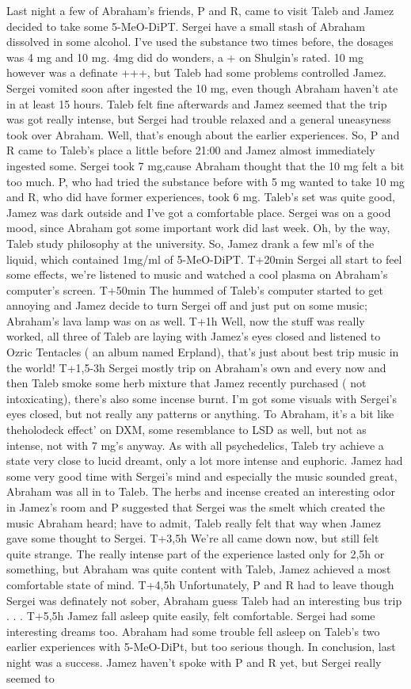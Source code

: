 \documentclass[12pt]{book}
\begin{document}
Last night a few of Abraham's friends, P and R, came to visit Taleb and Jamez decided to take some 5-MeO-DiPT. Sergei have a small stash of Abraham dissolved in some alcohol. I've used the substance two times before, the dosages was 4 mg and 10 mg. 4mg did do wonders, a + on Shulgin's rated. 10 mg however was a definate +++, but Taleb had some problems controlled Jamez. Sergei vomited soon after ingested the 10 mg, even though Abraham haven't ate in at least 15 hours. Taleb felt fine afterwards and Jamez seemed that the trip was got really intense, but Sergei had trouble relaxed and a general uneasyness took over Abraham. Well, that's enough about the earlier experiences. So, P and R came to Taleb's place a little before 21:00 and Jamez almost immediately ingested some. Sergei took 7 mg,cause Abraham thought that the 10 mg felt a bit too much. P, who had tried the substance before with 5 mg wanted to take 10 mg and R, who did have former experiences, took 6 mg. Taleb's set was quite good, Jamez was dark outside and I've got a comfortable place. Sergei was on a good mood, since Abraham got some important work did last week. Oh, by the way, Taleb study philosophy at the university. So, Jamez drank a few ml's of the liquid, which contained 1mg/ml of 5-MeO-DiPT. T+20min Sergei all start to feel some effects, we're listened to music and watched a cool plasma on Abraham's computer's screen. T+50min The hummed of Taleb's computer started to get annoying and Jamez decide to turn Sergei off and just put on some music; Abraham's lava lamp was on as well. T+1h Well, now the stuff was really worked, all three of Taleb are laying with Jamez's eyes closed and listened to Ozric Tentacles ( an album named Erpland), that's just about best trip music in the world! T+1,5-3h Sergei mostly trip on Abraham's own and every now and then Taleb smoke some herb mixture that Jamez recently purchased ( not intoxicating), there's also some incense burnt. I'm got some visuals with Sergei's eyes closed, but not really any patterns or anything. To Abraham, it's a bit like theholodeck effect' on DXM, some resemblance to LSD as well, but not as intense, not with 7 mg's anyway. As with all psychedelics, Taleb try achieve a state very close to lucid dreamt, only a lot more intense and euphoric. Jamez had some very good time with Sergei's mind and especially the music sounded great, Abraham was all in to Taleb. The herbs and incense created an interesting odor in Jamez's room and P suggested that Sergei was the smelt which created the music Abraham heard; have to admit, Taleb really felt that way when Jamez gave some thought to Sergei. T+3,5h We're all came down now, but still felt quite strange. The really intense part of the experience lasted only for 2,5h or something, but Abraham was quite content with Taleb, Jamez achieved a most comfortable state of mind. T+4,5h Unfortunately, P and R had to leave though Sergei was definately not sober, Abraham guess Taleb had an interesting bus trip . . .  T+5,5h Jamez fall asleep quite easily, felt comfortable. Sergei had some interesting dreams too. Abraham had some trouble fell asleep on Taleb's two earlier experiences with 5-MeO-DiPt, but too serious though. In conclusion, last night was a success. Jamez haven't spoke with P and R yet, but Sergei really seemed to 
\end{document}
